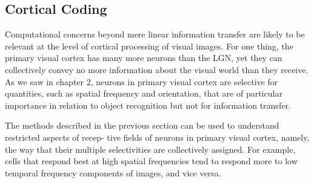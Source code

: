 \subsection{Cortical Coding}
\begin{rem}
  Computational concerns beyond mere linear information transfer are
likely to be relevant at the level of cortical processing of visual
images. For one thing, the primary visual cortex has many more neurons than the
LGN, yet they can collectively convey no more information about the visual world than they receive. As we saw in chapter 2, neurons in primary
visual cortex are selective for quantities, such as spatial frequency and orientation, that are of particular importance in relation to object recognition
but not for information transfer.
\end{rem}
\begin{rem}
  The methods described in
the previous section can be used to understand restricted aspects of recep-
tive fields of neurons in primary visual cortex, namely, the way that their
multiple selectivities are collectively assigned. For example, cells that respond best at high spatial frequencies tend to respond more to low temporal frequency components of images, and vice versa.
\end{rem}
